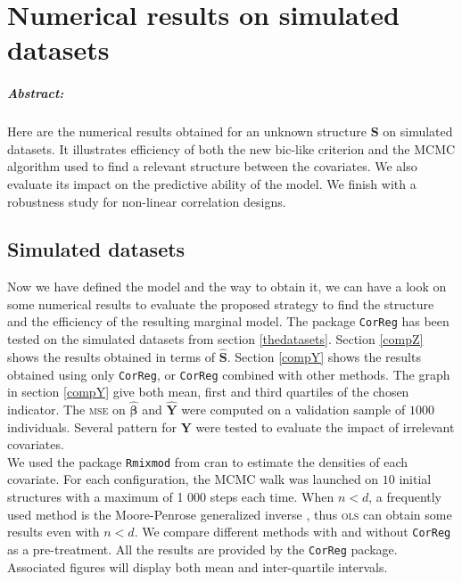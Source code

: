 \documentclass[12pt,a4paper]{report}
\begin{document}
	\chapter{Numerical results on simulated datasets} \label{sectionsimul}
\paragraph{Abstract:} Here are the numerical results obtained for an unknown structure $\boldsymbol{S}$ on simulated datasets. It illustrates efficiency of both the new {\sc bic}-like criterion and the MCMC algorithm used to find a relevant structure between the covariates. We also evaluate its impact on the predictive ability of the model. We finish with a robustness study for non-linear correlation designs.
		 

	\section{Simulated datasets}	
	Now we have defined the model and the way to obtain it, we can have a look on some numerical results to evaluate the proposed strategy to find the structure and the efficiency of the resulting marginal model.	The package {\tt CorReg} has been tested on the simulated datasets from section \ref{thedatasets}.
Section \ref{compZ} shows the results obtained in terms of $\hat{\boldsymbol{S}}$. Section \ref{compY} shows the results obtained using only {\tt CorReg}, or {\tt CorReg} combined with other methods. The graph in section \ref{compY} give both mean, first and third quartiles of the chosen indicator. The \textsc{mse} on $\hat{\boldsymbol{\beta}}$ and $\hat{\boldsymbol{Y}}$ were computed on a validation sample of $1 000$ individuals. Several pattern for $\boldsymbol{Y}$ were tested to evaluate the impact of irrelevant covariates.\\

	We used the package { \tt Rmixmod} from {\sc cran} \cite{packageRmixmod} to estimate the densities of each covariate. For each configuration, the MCMC walk was launched on $10$ initial structures with a maximum of 1 000 steps each time.
	When $n<d$, a frequently used method is the Moore-Penrose generalized inverse \cite{katsikis2008fast}, thus \textsc{ols} can obtain some results even with $n<d$. %
	We compare different methods with and without {\tt CorReg} as a pre-treatment. All the results are provided by the {\tt CorReg} package. Associated figures will display both mean and inter-quartile intervals.
	
\end{document}
